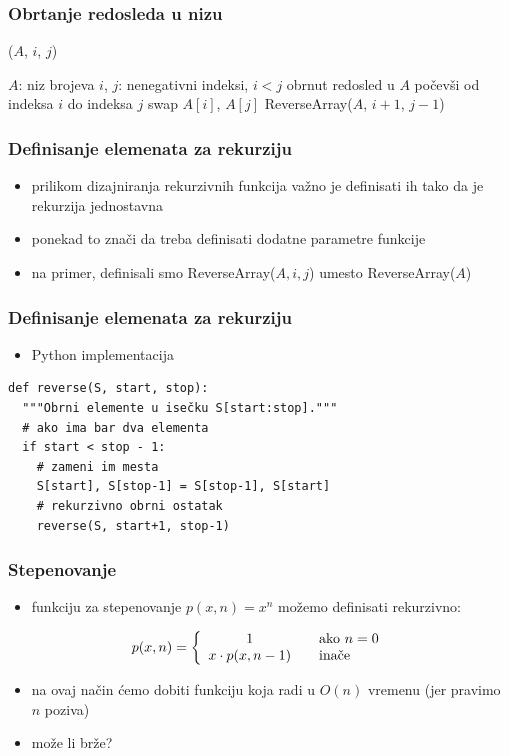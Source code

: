 \documentclass[compress]{beamer}
\begin{document}
\begin{frame}[fragile]
  \frametitle{Obrtanje redosleda u nizu}
($A$, $i$, $j$)
\begin{algorithmic}
\REQUIRE $A$: niz brojeva
\REQUIRE $i$, $j$: nenegativni indeksi, $i<j$
\ENSURE obrnut redosled u $A$ počevši od indeksa $i$ do indeksa $j$
  \STATE swap $A[i]$, $A[j]$
  \STATE ReverseArray($A$, $i+1$, $j-1$)
\ENDIF
\end{algorithmic}
\end{frame}
\begin{frame}[fragile]
  \frametitle{Definisanje elemenata za rekurziju}
  \begin{itemize}
    \item prilikom dizajniranja rekurzivnih funkcija važno je definisati ih tako da je rekurzija jednostavna
    \item ponekad to znači da treba definisati dodatne parametre funkcije
    \item na primer, definisali smo ReverseArray($A, i, j$) umesto ReverseArray($A$)
  \end{itemize}
\end{frame}
\begin{frame}[fragile]
  \frametitle{Definisanje elemenata za rekurziju}
  \begin{itemize}
    \item Python implementacija
  \end{itemize}
\begin{verbatim}
def reverse(S, start, stop):
  """Obrni elemente u isečku S[start:stop]."""
  # ako ima bar dva elementa
  if start < stop - 1:
    # zameni im mesta
    S[start], S[stop-1] = S[stop-1], S[start]
    # rekurzivno obrni ostatak
    reverse(S, start+1, stop-1)               
\end{verbatim}
\end{frame}

\begin{frame}[fragile]
  \frametitle{Stepenovanje}
  \begin{itemize}
    \item funkciju za stepenovanje $p(x,n) = x^n$ možemo definisati rekurzivno:
  \end{itemize}
  $$ p(x,n) = \left\{ \begin{array}{c l} 1 & \quad \text{ako } n=0 \\x\cdot p(x, n-1) & \quad \text{inače}\end{array}\right. $$
  \begin{itemize}
    \item na ovaj način ćemo dobiti funkciju koja radi u $O(n)$ vremenu (jer pravimo $n$ poziva)
    \item može li brže?
  \end{itemize}
\end{frame}
\end{document}
